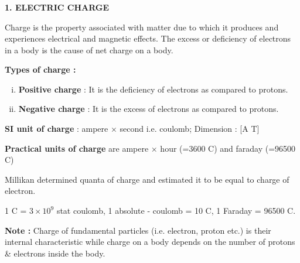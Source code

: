 \begin{frame}[t]
\frametitle{}

\renewcommand{\familydefault}{\rmdefault}


\noindent
\textbf{1. ELECTRIC CHARGE}

\vspace{0.7em}

\noindent
\small
Charge is the property associated with matter due to which it produces and experiences electrical and magnetic effects. The excess or deficiency of electrons in a body is the cause of net charge on a body.

\vspace{0.7em}

\noindent
\textbf{Types of charge :}

\begin{enumerate}[(i)]
    \item<+-> \textbf{Positive charge} : It is the deficiency of electrons as compared to protons.
    \item<+-> \textbf{Negative charge} : It is the excess of electrons as compared to protons.
\end{enumerate}

\vspace{0.7em}

\noindent
\textbf{SI unit of charge} : ampere × second i.e. coulomb; Dimension : [A T]

\vspace{0.2em}
\noindent
\textbf{Practical units of charge} are ampere × hour (=3600 C) and faraday (=96500 C)

\vspace{0.7em}

\item<+-> Millikan determined quanta of charge and estimated it to be equal to charge of electron.
    \item<+-> 1 C = $3 \times 10^9$ stat coulomb, 1 absolute - coulomb = 10 C, 1 Faraday = 96500 C.

\vspace{0.7em}

\noindent
\textbf{Note :} Charge of fundamental particles (i.e. electron, proton etc.) is their internal characteristic while charge on a body depends on the number of protons \& electrons inside the body.

\end{frame}

